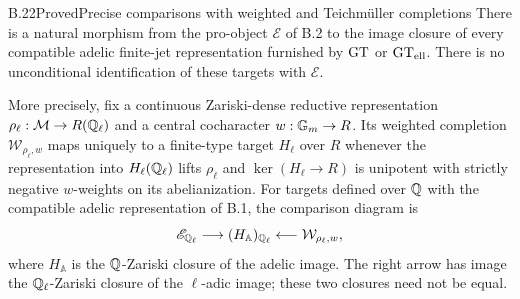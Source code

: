 \begin{statement}{B.22}{Proved}{Precise comparisons with weighted and Teichm\"uller completions}
There is a natural morphism from the pro-object $\mathscr E$ of B.2
to the image closure of every compatible adelic finite-jet
representation furnished by $\mathrm{GT}$ or $\mathrm{GT}_{\rm ell}$. There is no
unconditional identification of these targets with $\mathscr E$.

More precisely, fix a continuous Zariski-dense reductive representation
$\rho_\ell:\mathcal M\to R(\mathbb Q_\ell)$ and a central cocharacter
$w:\mathbb G_m\to R$. Its weighted completion
$\mathcal W_{\rho_\ell,w}$ maps uniquely to a finite-type target
$H_\ell$ over $R$ whenever the representation into $H_\ell(\mathbb Q_\ell)$
lifts $\rho_\ell$ and $\ker(H_\ell\to R)$ is unipotent with
strictly negative $w$-weights on its abelianization. For targets
defined over $\mathbb Q$ with the compatible adelic representation of B.1,
the comparison diagram is
\[
 \mathscr E_{\mathbb Q_\ell}\longrightarrow (H_{\mathbb A})_{\mathbb Q_\ell}
 \longleftarrow\mathcal W_{\rho_\ell,w},
\]
where $H_{\mathbb A}$ is the $\mathbb Q$-Zariski closure of the adelic
image. The right arrow has image the $\mathbb Q_\ell$-Zariski closure of
the $\ell$-adic image; these two closures need not be equal.
\end{statement}
